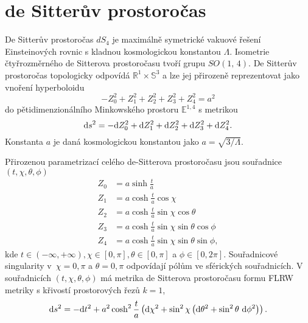 \section{de Sitterův prostoročas}

De Sitterův prostoročas $dS_4$ je maximálně symetrické vakuové řešení Einsteinových rovnic s kladnou kosmologickou
konstantou $\Lambda$. Isometrie čtyřrozměrného de Sitterova prostoročasu tvoří grupu $SO(1,\,4)$. De Sitterův prostoročas topologicky odpovídá
$\mathbb{R}^1 \times \mathbb{S}^3$ a lze jej přirozeně reprezentovat jako vnoření hyperboloidu
\begin{equation}
     \label{eq:dS_hyperboloid}
     - Z_0^2 + Z_1^2 + Z_2^2 + Z_3^2 + Z_4^2 = a^2
\end{equation}
do pětidimenzionálního Minkowského prostoru $\mathbb{E}^{1,4}$ s metrikou
\begin{equation}
     \label{eq:5d_minkowski}
     \mathrm{d} s^2 = - \mathrm{d} Z_0^2 + \mathrm{d} Z_1^2 + \mathrm{d} Z_2^2 + \mathrm{d} Z_3^2 + \mathrm{d} Z_4^2.
\end{equation}
Konstanta $a$ je daná kosmologickou konstantou jako $a = \sqrt{3/\Lambda}$.

Přirozenou parametrizací celého de-Sitterova prostoročasu jsou souřadnice $(t, \chi, \theta, \phi)$
\begin{equation}
     \begin{split}
          Z_0 &= a \sinh \frac{t}{a} \\
          Z_1 &= a \cosh \frac{t}{a} \cos \chi \\
          Z_2 &= a \cosh \frac{t}{a} \sin \chi \cos \theta \\
          Z_3 &= a \cosh \frac{t}{a} \sin \chi \sin \theta \cos \phi \\
          Z_4 &= a \cosh \frac{t}{a} \sin \chi \sin \theta \sin \phi,
     \end{split}
\end{equation}
kde $t \in \left(-\infty, +\infty\right), \chi \in \left[0, \pi\right], \theta \in \left[0, \pi \right]$ a
$\phi \in \left[0, 2\pi\right]$. Souřadnicové singularity v~$\chi = 0, \pi$ a $\theta = 0, \pi$ odpovídají pólům
ve sférických souřadnicích.
V souřadnicích $(t, \chi, \theta, \phi)$ má metrika de Sitterova prostoročasu formu FLRW metriky s
křivostí prostorových řezů $k=1$,
\begin{equation}
     \mathrm{d} s^2 = - \mathrm{d} t^2 + a^2 \cosh^2 \frac{t}{a} \left(\mathrm{d} \chi^2 + \sin^2 \chi \left( \mathrm{d} \theta^2 + \sin^2 \theta ~ \mathrm{d} \phi^2\right) \right).
\end{equation}

